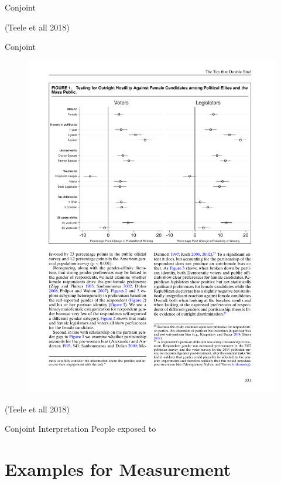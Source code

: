 \documentclass[
  ignorenonframetext,
]{beamer}
\begin{document}
\begin{frame}{Conjoint}
\begin{figure}
{}

\end{figure}

(Teele et all 2018)
\end{frame}

\begin{frame}{Conjoint}
\protect\hypertarget{conjoint-1}{}
\begin{figure}

{\centering \includegraphics[width=0.8\linewidth]{./figs/survey-exp-teele-2018-results} 

}

\end{figure}

(Teele et all 2018)
\end{frame}

\begin{frame}{Conjoint Interpretation}
\protect\hypertarget{conjoint-interpretation}{}
People exposed to
\end{frame}

\hypertarget{examples-for-measurement}{%
\section{Examples for Measurement}\label{examples-for-measurement}}
\end{document}
